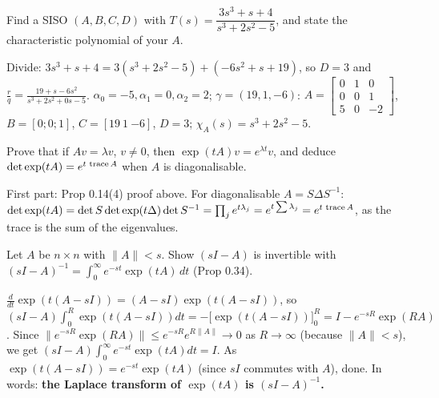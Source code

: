 \begin{qbox}[title={Q2.2 (realisation)}]
Find a SISO $(A,B,C,D)$ with $T(s)=\dfrac{3s^3+s+4}{s^3+2s^2-5}$, and state the characteristic polynomial of your $A$.
\end{qbox}
\begin{solbox}
Divide: $3s^3+s+4=3(s^3+2s^2-5)+(-6s^2+s+19)$, so $D=3$ and $\frac{r}{q}=\frac{19+s-6s^2}{s^3+2s^2+0s-5}$.
$\alpha_0=-5,\alpha_1=0,\alpha_2=2$; $\gamma=(19,1,-6)$:
$A=\begin{bmatrix}0&1&0\\0&0&1\\5&0&-2\end{bmatrix}$, $B=[0;0;1]$, $C=[19\ 1\ {-6}]$, $D=3$; $\chi_A(s)=s^3+2s^2-5$.
\end{solbox}

\begin{qbox}[title={Q2.3 (proof)}]
Prove that if $Av=\lambda v$, $v\neq0$, then $\exp(tA)v=e^{\lambda t}v$, and deduce $\det\exp(tA)=e^{t\,\operatorname{trace} A}$ when $A$ is diagonalisable.
\end{qbox}
\begin{solbox}
First part: Prop 0.14(4) proof above. For diagonalisable $A=S\Delta S^{-1}$: $\det\exp(tA)=\det S\det\exp(t\Delta)\det S^{-1}=\prod_je^{t\lambda_j}=e^{t\sum\lambda_j}=e^{t\,\operatorname{trace} A}$, as the trace is the sum of the eigenvalues.
\end{solbox}

\begin{qbox}[title={Q2.4 (harder)}]
Let $A$ be $n\times n$ with $\|A\|<s$. Show $(sI-A)$ is invertible with $(sI-A)^{-1}=\int_0^\infty e^{-st}\exp(tA)\,dt$ (Prop 0.34).
\end{qbox}
\begin{solbox}
$\frac{d}{dt}\exp(t(A-sI))=(A-sI)\exp(t(A-sI))$, so $(sI-A)\int_0^R\exp(t(A-sI))dt=-\big[\exp(t(A-sI))\big]_0^R=I-e^{-sR}\exp(RA)$.
Since $\|e^{-sR}\exp(RA)\|\le e^{-sR}e^{R\|A\|}\to0$ as $R\to\infty$ (because $\|A\|<s$), we get $(sI-A)\int_0^\infty e^{-st}\exp(tA)dt=I$. As $\exp(t(A-sI))=e^{-st}\exp(tA)$ (since $sI$ commutes with $A$), done.
In words: \textbf{the Laplace transform of $\exp(tA)$ is $(sI-A)^{-1}$.}
\end{solbox}
\newpage

